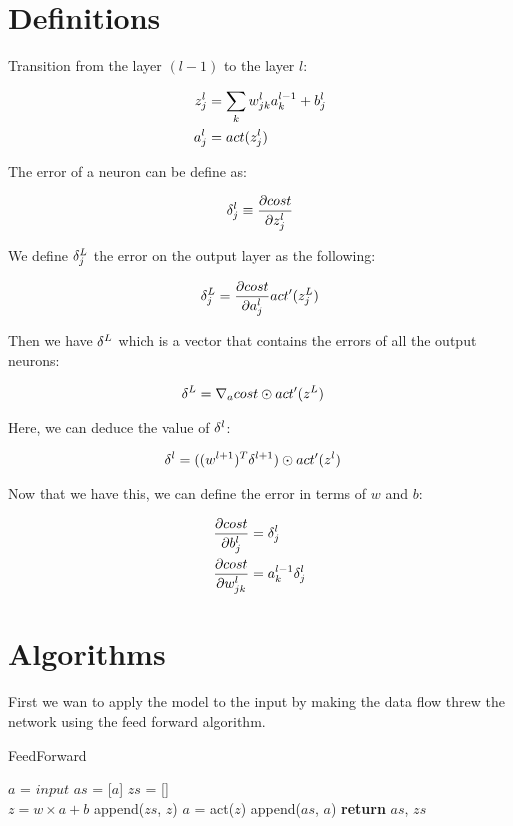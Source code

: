 \documentclass[a4paper]{article}
\begin{document}
\clearpage{}
\section{Definitions}

Transition from the layer $(l - 1)$ to the layer $l$:

\begin{align}
  z_{j}^{l} &= \sum_{k}{w_{jk}^{l}a_{k}^{l-1} + b_{j}^{l}} \\
  a_{j}^{l} &= act(z_{j}^{l})
\end{align}

The error of a neuron can be define as:

\begin{align}
  \delta_{j}^{l} \equiv \frac{\partial cost}{\partial z_{j}^{l}}
\end{align}

We define $\delta_{j}^{L}$ the error on the output layer as the following:

\begin{align}
  \delta_{j}^{L} = \frac{\partial cost}{\partial a_{j}^{l}}act'(z_{j}^{L})
\end{align}

Then we have $\delta^{L}$ which is a vector that contains the errors of all the
output neurons:

\begin{align}
  \delta^{L} &= \nabla_{a} cost \odot act'(z^{L})
\end{align}

Here, we can deduce the value of $\delta^{l}$:

\begin{align}
  \delta^{l} &= ((w^{l+1})^{T}\delta^{l+1}) \odot act'(z^{l})
\end{align}

Now that we have this, we can define the error in terms of $w$ and $b$:

\begin{align}
  \frac{\partial cost}{\partial b_{j}^{l}} &= \delta_{j}^{l} \\
  \frac{\partial cost}{\partial w_{jk}^{l}} &= a_{k}^{l-1} \delta_{j}^{l}
\end{align}


\clearpage{}
\section{Algorithms}

First we wan to apply the model to the input by making the data flow threw the
network using the feed forward algorithm.

\begin{algorithm}
  \caption{FeedForward}
  \begin{algorithmic}
      \State $a$ = $input$
      \State $as$ = [$a$]
      \State $zs$ = []\\

          \State $z = w \times a + b$
          \State append($zs$, $z$)
          \State $a$ = act($z$)
          \State append($as$, $a$)
      \EndFor
      \State \textbf{return} $as$, $zs$
    \EndProcedure
  \end{algorithmic}
\end{algorithm}
\end{document}
